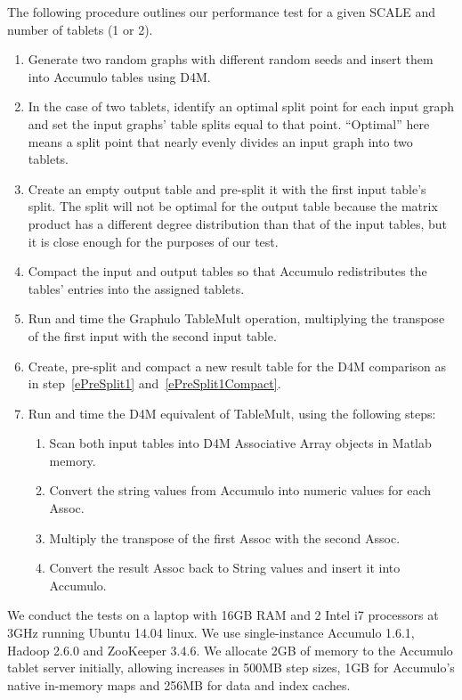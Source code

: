The following procedure outlines our performance test for a given SCALE and number of tablets (1 or 2).
\begin{enumerate}
\item Generate two random graphs with different random seeds and insert them into Accumulo tables using D4M.
\item In the case of two tablets, identify an optimal split point for each input graph
and set the input graphs' table splits equal to that point.
``Optimal'' here means a split point that nearly evenly divides an input graph into two tablets.
\item \label{ePreSplit1} Create an empty output table and pre-split it with the first input table's split.
The split will not be optimal for the output table because the matrix product has a different degree distribution 
than that of the input tables, but it is close enough for the purposes of our test.
\item \label{ePreSplit1Compact} Compact the input and output tables 
so that Accumulo redistributes the tables' entries into the assigned tablets.
\item Run and time the Graphulo TableMult operation, 
multiplying the transpose of the first input with the second input table.
\item Create, pre-split and compact a new result table for the D4M comparison 
as in step~\ref{ePreSplit1} and~\ref{ePreSplit1Compact}.
\item Run and time the D4M equivalent of TableMult, using the following steps:
 \begin{enumerate}
 \item Scan both input tables into D4M Associative Array objects in Matlab memory.
 \item Convert the string values from Accumulo into numeric values for each Assoc.
 \item Multiply the transpose of the first Assoc with the second Assoc.
 \item Convert the result Assoc back to String values and insert it into Accumulo.
 \end{enumerate}
\end{enumerate}

We conduct the tests on a laptop with 16GB RAM and 2 Intel i7 processors at 3GHz
running Ubuntu 14.04 linux. We use single-instance Accumulo 1.6.1, Hadoop 2.6.0 and ZooKeeper 3.4.6.
We allocate 2GB of memory to the Accumulo tablet server initially, allowing increases in 500MB step sizes,
1GB for Accumulo's native in-memory maps and 256MB for data and index caches.


